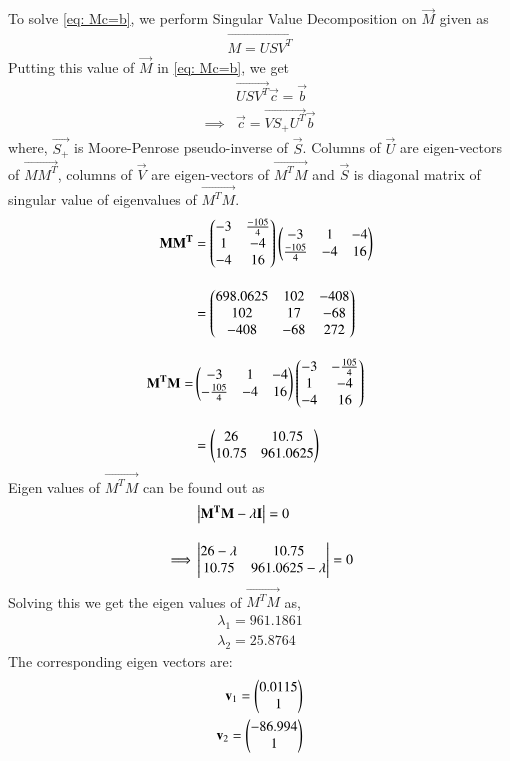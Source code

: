 \documentclass[journal,12pt,twocolumn]{IEEEtran}
\begin{document}
To solve \eqref{eq: Mc=b}, we perform Singular Value Decomposition on $\vec{M}$ given as 
\begin{align}
	\vec{M = USV^T }\label{eq: SVD}
\end{align}
Putting this value of $\vec{M}$ in \eqref{eq: Mc=b}, we get
\begin{align}
	&\vec{USV^T}\vec{c} = \vec{b} \\
\implies& \vec{c} = \vec{VS_+U^T}\vec{b}\label{eq: c}
\end{align}
where, $\vec{S_+}$ is Moore-Penrose pseudo-inverse of $\vec{S}$. Columns of $\vec{U}$ are eigen-vectors of $\vec{MM^T}$, columns of $\vec{V}$ are eigen-vectors of $\vec{M^TM}$ and $\vec{S}$ is diagonal matrix of singular value of eigenvalues of $\vec{M^TM}$.
\begin{align}
    \mathbf {MM^T} &= \begin{pmatrix}-3 & \frac{-105}{4}\\1 & -4\\ -4 & 16\end{pmatrix} \begin{pmatrix}-3 & 1 & -4\\ \frac{-105}{4} & -4 & 16\end{pmatrix}\\[1em]
    & = \begin{pmatrix}698.0625 & 102 & -408\\ 102 & 17 & -68\\-408 & -68 & 272\end{pmatrix}\\[1em]
    \mathbf{M^TM}=& \begin{pmatrix}-3 & 1 & -4\\-\frac{105}{4} & -4 & 16\end{pmatrix} \begin{pmatrix}-3& -\frac{105}{4}\\1 & -4\\-4 & 16\end{pmatrix}\\[1em]
    &= \begin{pmatrix}26 & 10.75\\ 10.75 & 961.0625\end{pmatrix}
\end{align}
Eigen values of $\vec{M^TM}$ can be found out as
\begin{align}
	 &\left\vert\mathbf{M^TM-\lambda I}\right\vert = 0\\[1em]
	 \implies & \begin{vmatrix}26- \lambda & 10.75\\ 10.75 & 961.0625 -\lambda\end{vmatrix}=0
\end{align}	
Solving this we get the eigen values of $\vec{M^TM}$ as, 
\begin{align}
    \lambda_1 = 961.1861\\
    \lambda_2=  25.8764
\end{align}
The corresponding eigen vectors are:
\begin{align}
    \mathbf v_1 = \begin{pmatrix}0.0115\\ 1\end{pmatrix}\\
    \mathbf v_2 = \begin{pmatrix}-86.994\\ 1\end{pmatrix}
\end{align}
\end{document}
